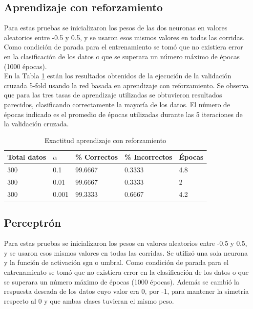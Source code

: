 \documentclass[a4paper]{article}
\begin{document}
	\subsection{Aprendizaje con reforzamiento}
		Para estas pruebas se inicializaron los pesos de las dos neuronas en valores aleatorios entre -0.5 y 0.5, y se usaron esos mismos valores en todas las corridas. Como condición de parada para el entrenamiento se tomó que no existiera error en la clasificación de los datos o que se superara un número máximo de épocas (1000 épocas).\\
		
		En la Tabla \ref{tabla:accReforzamiento} están los resultados obtenidos de la ejecución de la validación cruzada 5-fold usando la red basada en aprendizaje con reforzamiento. Se observa que para las tres tasas de aprendizaje utilizadas se obtuvieron resultados parecidos, clasificando correctamente la mayoría de los datos. El número de épocas indicado es el promedio de épocas utilizadas durante las 5 iteraciones de la validación cruzada.
		\begin{table}[H]
		\begin{center}
		\begin{tabular}{|l|l|l|l|l|}
		\hline
		Total datos & $\alpha$ & \% Correctos & \% Incorrectos & Épocas\\
		\hline \hline
		300 & 0.1 & 99.6667 & 0.3333 & 4.8 \\ \hline
		300 & 0.01 & 99.6667 & 0.3333 & 2\\ \hline
		300 & 0.001 & 99.3333 & 0.6667 & 4.2\\ \hline
		\end{tabular}
		\caption{Exactitud aprendizaje con reforzamiento}
		\label{tabla:accReforzamiento}
		\end{center}
		\end{table}
	
	\subsection{Perceptrón}
		Para estas pruebas se inicializaron los pesos en valores aleatorios entre -0.5 y 0.5, y se usaron esos mismos valores en todas las corridas. Se utilizó una sola neurona y la función de activación sgn o umbral. Como condición de parada para el entrenamiento se tomó que no existiera error en la clasificación de los datos o que se superara un número máximo de épocas (1000 épocas). Además se cambió la respuesta deseada de los datos cuyo valor era 0, por -1, para mantener la simetría respecto al 0 y que ambas clases tuvieran el mismo peso.\\
		
\end{document}
